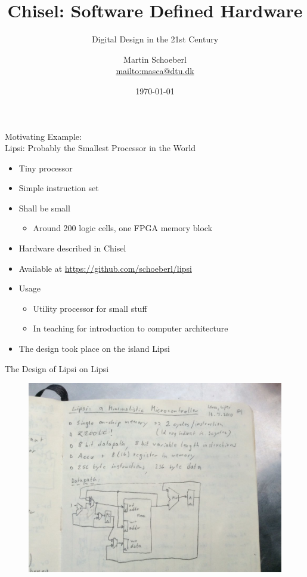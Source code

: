 

\newif\ifbook


\title{Chisel: Software Defined Hardware}
\subtitle{Digital Design in the 21st Century}
\author{Martin Schoeberl\\
\url{mailto:masca@dtu.dk}}
\date{\today}



\begin{frame}
\titlepage
\end{frame}

\begin{frame}[fragile]{Motivating Example:\\
Lipsi: Probably the Smallest Processor in the World}
\begin{itemize}
\item Tiny processor
\item Simple instruction set
\item Shall be small
\begin{itemize}
\item Around 200 logic cells, one FPGA memory block
\end{itemize}
\item Hardware described in Chisel
\item Available at \url{https://github.com/schoeberl/lipsi}
\item Usage
\begin{itemize}
\item Utility processor for small stuff
\item In teaching for introduction to computer architecture
\end{itemize}
\item The design took place on the island Lipsi
\end{itemize}
\end{frame}

\begin{frame}[fragile]{The Design of Lipsi on Lipsi}
\begin{figure}
    \centering
    \includegraphics[scale=0.3]{lipsi}
\end{figure}
\end{frame}

